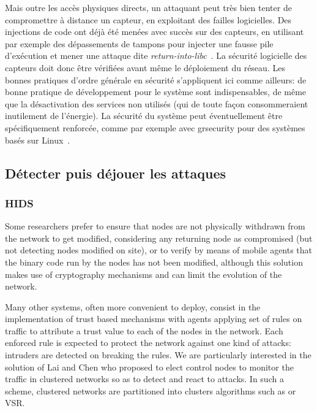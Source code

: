 Mais outre les accès physiques directs, un attaquant peut très bien tenter de compromettre à distance un capteur, en exploitant des failles logicielles.
Des injections de code ont déjà été menées avec succès sur des capteurs, en utilisant par exemple des dépassements de tampons pour injecter une fausse pile d'exécution et mener une attaque dite \textit{return-into-libc}~\cite{FC08}.
La sécurité logicielle des capteurs doit donc être vérifiées avant même le déploiement du réseau.
Les bonnes pratiques d'ordre générale en sécurité s'appliquent ici comme ailleurs: de bonne pratique de développement pour le système sont indispensables, de même que la désactivation des services non utilisés (qui de toute façon consommeraient inutilement de l'énergie).
La sécurité du système peut éventuellement être spécifiquement renforcée, comme par exemple avec grsecurity pour des systèmes basés sur Linux~\cite{GFN11}.

\subsection{Détecter puis déjouer les attaques}

\subsubsection{HIDS}\label{ea:sss:hids}
Some researchers prefer to ensure that nodes are not physically withdrawn from the network to get modified\cite{Ho10}, considering any returning node as compromised (but not detecting nodes modified on site), or to verify by means of mobile agents that the binary code run by the nodes has not been modified\cite{HR13}, although this solution makes use of cryptography mechanisms and can limit the evolution of the network.


\cite{HI12}

Many other systems, often more convenient to deploy, consist in the implementation of trust based mechanisms\cite{MC10,F-GRL07} with agents applying set of rules\cite{RKKK13} on traffic to attribute a trust value to each of the nodes in the network.
Each enforced rule is expected to protect the network against one kind of attacks: intruders are detected on breaking the rules.
We are particularly interested in the solution of Lai and Chen\cite{LC08} who proposed to elect control nodes to monitor the traffic in clustered networks so as to detect and react to \dos attacks.
In such a scheme, clustered networks are partitioned into clusters \via algorithms such as \leach\cite{HHT02} or VSR\cite{TV08}.



